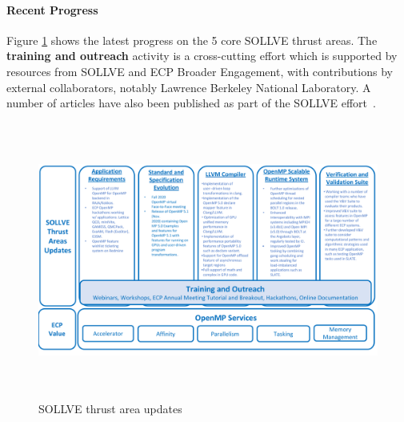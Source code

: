 \paragraph{Recent Progress}
Figure \ref{fig:sollve-update} shows the latest progress on the 5 core SOLLVE
thrust areas. The {\bf training and outreach} activity is a
cross-cutting effort which is supported by resources from SOLLVE and  ECP Broader Engagement,
 with contributions by external collaborators, notably Lawrence Berkeley National
Laboratory.   
A number of articles have also been published
as part of the SOLLVE
effort~\cite{openmp-tr6,zinenko.cc.2018,vandv2019,
tregion, Mishra:2019:KFA:3314872.3314915,
udm, loopTransPragmas, DBLP:conf/iwomp/SreenivasanJHBS19,
DBLP:conf/iwomp/ScoglandSOHES19, DBLP:conf/iwomp/0001WLSS19,
DBLP:conf/iwomp/KaleIKKC19, Bak2019OptimizedEO, lsrt, boltPACT19}.



\begin{figure}[t]
\includegraphics[width=1.0\linewidth,height=9.1cm]{projects/2.3.2-Tools/2.3.2.11-SOLLVE/SOLLVE-progress}
\caption{\label{fig:sollve-update}SOLLVE thrust area updates}
\end{figure}


